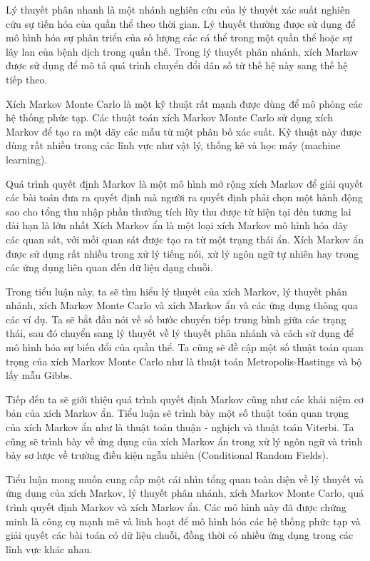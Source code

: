 \documentclass[14pt, a4paper]{article}
\numberwithin{equation}{section}
\numberwithin{figure}{section}
\theoremstyle{sltheorem}
\theoremstyle{soltheorem}
\numberwithin{dl}{section}
\numberwithin{md}{section}
\numberwithin{vd}{section}
\begin{document}
    Lý thuyết phân nhanh là một nhánh nghiên cứu của lý thuyết xác suất nghiên cứu sự tiến hóa của quần thể theo thời gian.
    Lý thuyết thường được sử dụng để mô hình hóa sự phân triển của số lượng các cá thể trong một quần thể hoặc sự lây lan của bệnh dịch trong quần thế.
    Trong lý thuyết phân nhánh, xích Markov được sử dụng để mô tả quá trình chuyển đổi dân số từ thế hệ này sang thế hệ tiếp theo.

    Xích Markov Monte Carlo là một kỹ thuật rất mạnh được dùng để mô phỏng các hệ thống phức tạp.
    Các thuật toán xích Markov Monte Carlo sử dụng xích Markov để tạo ra một dãy các mẫu từ một phân bố xác suất.
    Kỹ thuật này được dùng rất nhiều trong các lĩnh vực như vật lý, thống kê và học máy (machine learning).

    Quá trình quyết định Markov là một mô hình mở rộng xích Markov để giải quyết các bài toán đưa ra quyết định mà người ra quyết định phải chọn một hành động sao cho tổng thu nhập phần thưởng tích lũy thu được từ hiện tại đến tương lai dài hạn là lớn nhất
    Xích Markov ẩn là một loại xích Markov mô hình hóa dãy các quan sát, với mỗi quan sát được tạo ra từ một trạng thái ẩn.
    Xích Markov ẩn được sử dụng rất nhiều trong xử lý tiếng nói, xử lý ngôn ngữ tự nhiên hay trong các ứng dụng liên quan đến dữ liệu dạng chuỗi.

    Trong tiểu luận này, ta sẽ tìm hiểu lý thuyết của xích Markov, lý thuyết phân nhánh, xích Markov Monte Carlo và xích Markov ẩn và các ứng dụng thông qua các ví dụ.
    Ta sẽ bắt đầu nói về số bước chuyển tiếp trung bình giữa các trạng thái, sau đó chuyển sang lý thuyết về lý thuyết phân nhánh và cách sử dụng để mô hình hóa sự biến đổi của quần thể.
    Ta cũng sẽ đề cập một số thuật toán quan trọng của xích Markov Monte Carlo như là thuật toán Metropolis-Hastings và bộ lấy mẫu Gibbs.

    Tiếp đến ta sẽ giới thiệu quá trình quyết định Markov cũng như các khái niệm cơ bản của xích Markov ẩn.
    Tiểu luận sẽ trình bày một số thuật toán quan trọng của xích Markov ẩn như là thuật toán thuận - nghịch và thuật toán Viterbi.
    Ta cũng sẽ trình bày về ứng dụng của xích Markov ẩn trong xử lý ngôn ngữ và trình bày sơ lược về trường điều kiện ngẫu nhiên (Conditional Random Fields).

    Tiểu luận mong muốn cung cấp một cái nhìn tổng quan toàn diện về lý thuyết và ứng dụng của xích Markov, lý thuyết phân nhánh, xích Markov Monte Carlo, quá trình quyết định Markov và xích Markov ẩn.
    Các mô hình này đã được chứng minh là công cụ mạnh mẽ và linh hoạt để mô hình hóa các hệ thống phức tạp và giải quyết các bài toán có dữ liệu chuỗi, đồng thời có nhiều ứng dụng trong các lĩnh vực khác nhau.
\end{document}
